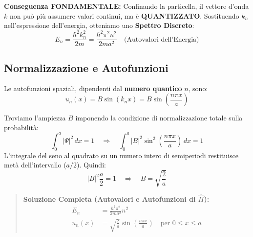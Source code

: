 \documentclass[11pt, a4paper]{article}
\begin{document}
\noindent
\textbf{Conseguenza FONDAMENTALE:} %
Confinando la particella, il vettore d'onda $k$ non può più assumere valori continui, ma è \textbf{QUANTIZZATO}. Sostituendo $k_n$ nell'espressione dell'energia, otteniamo uno \textbf{Spettro Discreto}: %
\begin{equation}
    \boxed{ E_n = \frac{\hbar^2 k_n^2}{2m} = \frac{\hbar^2 \pi^2 n^2}{2 m a^2} } \quad \text{(Autovalori dell'Energia)} %
\end{equation}

\subsection{Normalizzazione e Autofunzioni} %

Le autofunzioni spaziali, dipendenti dal \textbf{numero quantico} $n$, sono: %
\begin{equation*}
    u_n(x) = B\sin(k_n x) = B\sin\left(\frac{n\pi x}{a}\right) %
\end{equation*}

\noindent
Troviamo l'ampiezza $B$ imponendo la condizione di normalizzazione totale sulla probabilità: %
\begin{equation*}
    \int_0^a |\Psi|^2 \, dx = 1 \quad \Rightarrow \quad \int_0^a |B|^2 \sin^2\left(\frac{n\pi x}{a}\right) \, dx = 1 %
\end{equation*}
L'integrale del seno al quadrato su un numero intero di semiperiodi restituisce metà dell'intervallo ($a/2$). Quindi: %
\begin{equation*}
    |B|^2 \frac{a}{2} = 1 \quad \Rightarrow \quad \boxed{ B = \sqrt{\frac{2}{a}} } %
\end{equation*}

\begin{quote}
    \textbf{Soluzione Completa (Autovalori e Autofunzioni di $\hat{H}$):} %
    \begin{align}
        E_n &= \frac{\hbar^2 \pi^2}{2 m a^2} n^2 \\ %
        u_n(x) &= \sqrt{\frac{2}{a}} \sin\left(\frac{n\pi x}{a}\right) \quad \text{per } 0 \le x \le a %
    \end{align}
\end{quote}
\end{document}
